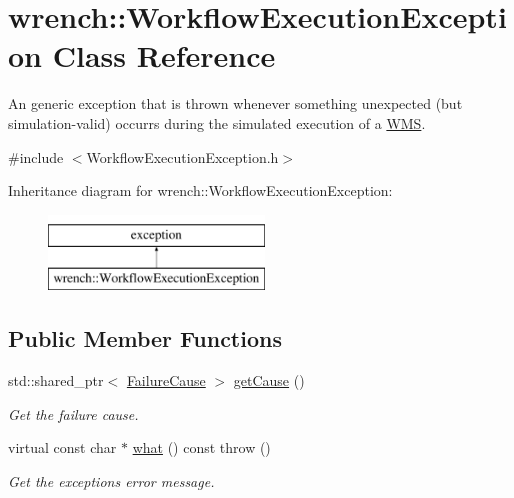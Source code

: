 \hypertarget{classwrench_1_1_workflow_execution_exception}{}\section{wrench\+:\+:Workflow\+Execution\+Exception Class Reference}
\label{classwrench_1_1_workflow_execution_exception}


An generic exception that is thrown whenever something unexpected (but simulation-\/valid) occurrs during the simulated execution of a \hyperlink{classwrench_1_1_w_m_s}{W\+MS}.  




{\ttfamily \#include $<$Workflow\+Execution\+Exception.\+h$>$}

Inheritance diagram for wrench\+:\+:Workflow\+Execution\+Exception\+:\begin{figure}[H]
\begin{center}
\leavevmode
\includegraphics[height=2.000000cm]{classwrench_1_1_workflow_execution_exception}
\end{center}
\end{figure}
\subsection*{Public Member Functions}
\begin{DoxyCompactItemize}
\item 
std\+::shared\+\_\+ptr$<$ \hyperlink{classwrench_1_1_failure_cause}{Failure\+Cause} $>$ \hyperlink{classwrench_1_1_workflow_execution_exception_a45fbbd2bc144da41f1fd09efcdaa2481}{get\+Cause} ()
\begin{DoxyCompactList}\small\item\em Get the failure cause. \end{DoxyCompactList}\item 
virtual const char $\ast$ \hyperlink{classwrench_1_1_workflow_execution_exception_a54f37236e3bfd00490835675220863c4}{what} () const  throw ()
\begin{DoxyCompactList}\small\item\em Get the exception\textquotesingle{}s error message. \end{DoxyCompactList}\end{DoxyCompactItemize}


